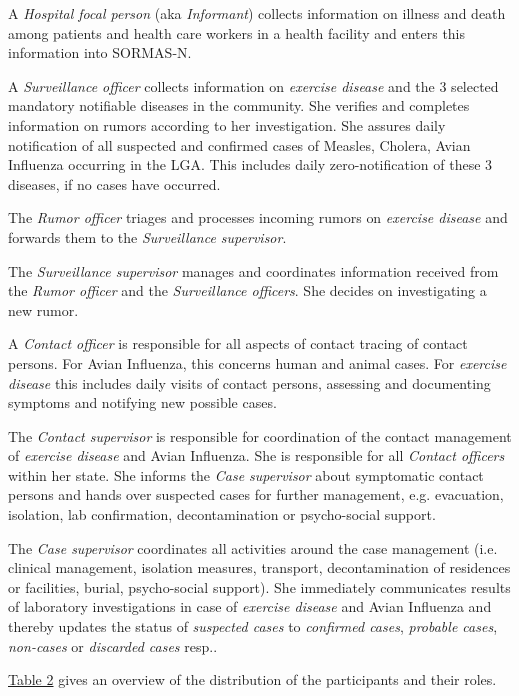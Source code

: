 \documentclass[a4paper, titlepage]{tufte-handout}
\begin{document}
A \emph{Hospital focal person} (aka \emph{Informant}) collects information on illness and death among patients and health care workers in a health facility and enters this information into SORMAS-N.

A \emph{Surveillance officer} collects information on \emph{exercise disease} and the 3 selected mandatory notifiable diseases in the community. She verifies and completes information on rumors according to her investigation. She assures daily notification of all suspected and confirmed cases of Measles, Cholera, Avian Influenza occurring in the LGA. This includes daily zero-notification of these 3 diseases, if no cases have occurred.

The \emph{Rumor officer} triages and processes incoming rumors on \emph{exercise disease} and forwards them to the \emph{Surveillance supervisor}.

The \emph{Surveillance supervisor} manages and coordinates information received from the \emph{Rumor officer} and the \emph{Surveillance officers}. She decides on investigating a new rumor. 

A \emph{Contact officer} is responsible for all aspects of contact tracing of contact persons. For Avian Influenza, this concerns human and animal cases. For \emph{exercise disease} this includes daily visits of contact persons, assessing and documenting symptoms and notifying new possible cases.

The \emph{Contact supervisor} is responsible for coordination of the contact management of \emph{exercise disease} and Avian Influenza. She is responsible for all \emph{Contact officers} within her state. She informs the \emph{Case supervisor} about symptomatic contact persons and hands over suspected cases for further management, e.g. evacuation, isolation, lab confirmation, decontamination or psycho-social support.

The \emph{Case supervisor} coordinates all activities around the case management (i.e. clinical management, isolation measures, transport, decontamination of residences or facilities, burial, psycho-social support). She immediately communicates results of laboratory investigations in case of \emph{exercise disease} and Avian Influenza and thereby updates the status of \emph{suspected cases} to \emph{confirmed cases}, \emph{probable cases}, \emph{non-cases} or \emph{discarded cases} resp..


\hyperref[tab:roles]{Table 2} gives an overview of the distribution of the participants and their roles. 
\end{document}
